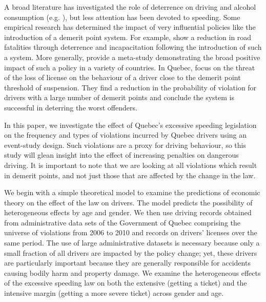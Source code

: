 A broad literature has investigated the role of deterrence on driving and alcohol consumption 
(e.g. \citet{hansen2015}), 
but less attention has been devoted to speeding. Some empirical research has determined the impact of very influential policies like the introduction of a demerit point system. For example, 
\citet{bennedittiniNicita2009} 
show a reduction in road fatalities through deterrence and incapacitation following the introduction of such a system. More generally, 
\citet{castillocastro2012} 
provide a meta-study demonstrating the broad positive impact of such a policy in a variety of countries. In Quebec, 
\citet{dionneetal2011} 
focus on the threat of the loss of license on the behaviour of a driver close to the demerit point threshold of suspension. They find a reduction in the probability of violation for drivers with a large number of demerit points and conclude the system is successful in deterring the worst offenders.

In this paper, we investigate the effect of Quebec’s excessive speeding legislation on the frequency and types of violations incurred by Quebec drivers using an event-study design. Such violations are a proxy for driving behaviour, so this study will glean insight into the effect of increasing penalties on dangerous driving. It is important to note that we are looking at all violations which result in demerit points, and not just those that are affected by the change in the law. 

We begin with a simple theoretical model to examine the predictions of economic theory on the effect of the law on drivers. The model predicts the possibility of heterogeneous effects by age and gender. We then use driving records obtained from administrative data sets of the Government of Quebec comprising the universe of violations from 2006 to 2010 and records on drivers’ licenses over the same period. The use of large administrative datasets is necessary because only a small fraction of all drivers are impacted by the policy change; yet, these drivers are particularly important because they are generally responsible for accidents causing bodily harm and property damage. We examine the heterogeneous effects of the excessive speeding law on both the extensive (getting a ticket) and the intensive margin (getting a more severe ticket) across gender and age. 


